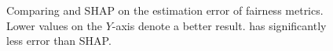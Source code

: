 \begin{figure}[!t]
	\begin{minipage}{0.49\textwidth}
		\centering
	\end{minipage}
	\begin{minipage}{0.5\textwidth}
		\centering
	\end{minipage}
	\caption[Accuracy of {\fairXplainer}]{Comparing {\fairXplainer} and SHAP on the estimation error of fairness metrics. Lower values on the $ Y $-axis denote a better result. {\fairXplainer} has significantly less error than SHAP.}\label{fig:estimation_error}
\end{figure}

